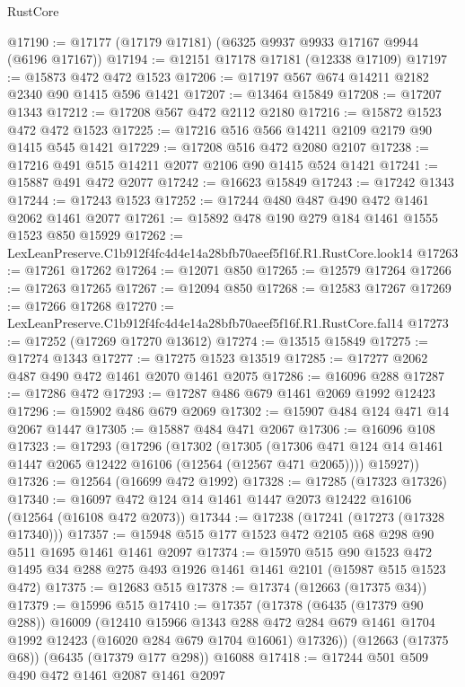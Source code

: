 \begin{lexlean}{RustCore}
\begin{coremodule}
@17190 := @17177 (@17179 @17181) (@6325 @9937 @9933 @17167 @9944 (@6196 @17167))
@17194 := @12151 @17178 @17181 (@12338 @17109)
@17197 := @15873 @472 @472 @1523
@17206 := @17197 @567 @674 @14211 @2182 @2340 @90 @1415 @596 @1421
@17207 := @13464 @15849
@17208 := @17207 @1343
@17212 := @17208 @567 @472 @2112 @2180
@17216 := @15872 @1523 @472 @472 @1523
@17225 := @17216 @516 @566 @14211 @2109 @2179 @90 @1415 @545 @1421
@17229 := @17208 @516 @472 @2080 @2107
@17238 := @17216 @491 @515 @14211 @2077 @2106 @90 @1415 @524 @1421
@17241 := @15887 @491 @472 @2077
@17242 := @16623 @15849
@17243 := @17242 @1343
@17244 := @17243 @1523
@17252 := @17244 @480 @487 @490 @472 @1461 @2062 @1461 @2077
@17261 := @15892 @478 @190 @279 @184 @1461 @1555 @1523 @850 @15929
@17262 := LexLeanPreserve.C1b912f4fc4d4e14a28bfb70aeef5f16f.R1.RustCore.look14
@17263 := @17261 @17262
@17264 := @12071 @850
@17265 := @12579 @17264
@17266 := @17263 @17265
@17267 := @12094 @850
@17268 := @12583 @17267
@17269 := @17266 @17268
@17270 := LexLeanPreserve.C1b912f4fc4d4e14a28bfb70aeef5f16f.R1.RustCore.fal14
@17273 := @17252 (@17269 @17270 @13612)
@17274 := @13515 @15849
@17275 := @17274 @1343
@17277 := @17275 @1523 @13519
@17285 := @17277 @2062 @487 @490 @472 @1461 @2070 @1461 @2075
@17286 := @16096 @288
@17287 := @17286 @472
@17293 := @17287 @486 @679 @1461 @2069 @1992 @12423
@17296 := @15902 @486 @679 @2069
@17302 := @15907 @484 @124 @471 @14 @2067 @1447
@17305 := @15887 @484 @471 @2067
@17306 := @16096 @108
@17323 := @17293
    (@17296
      (@17302
        (@17305 (@17306 @471 @124 @14 @1461 @1447 @2065 @12422 @16106 (@12564 (@12567 @471 @2065))))
        @15927))
@17326 := @12564 (@16699 @472 @1992)
@17328 := @17285 (@17323 @17326)
@17340 := @16097 @472 @124 @14 @1461 @1447 @2073 @12422 @16106 (@12564 (@16108 @472 @2073))
@17344 := @17238 (@17241 (@17273 (@17328 @17340)))
@17357 := @15948 @515 @177 @1523 @472 @2105 @68 @298 @90 @511 @1695 @1461 @1461 @2097
@17374 := @15970
    @515
    @90
    @1523
    @472
    @1495
    @34
    @288
    @275
    @493
    @1926
    @1461
    @1461
    @2101
    (@15987 @515 @1523 @472)
@17375 := @12683 @515
@17378 := @17374 (@12663 (@17375 @34))
@17379 := @15996 @515
@17410 := @17357
    (@17378
      (@6435 (@17379 @90 @288))
      @16009
      (@12410
        @15966
        @1343
        @288
        @472
        @284
        @679
        @1461
        @1704
        @1992
        @12423
        (@16020 @284 @679 @1704 @16061)
        @17326))
    (@12663 (@17375 @68))
    (@6435 (@17379 @177 @298))
    @16088
@17418 := @17244 @501 @509 @490 @472 @1461 @2087 @1461 @2097

\end{coremodule}
\end{lexlean}
